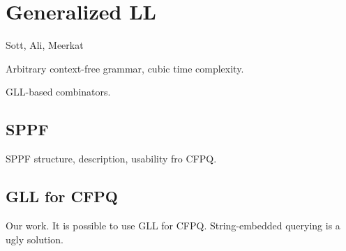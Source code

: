 \section{Generalized LL}

Sott, Ali, Meerkat

Arbitrary context-free grammar, cubic time complexity.

GLL-based combinators.


\subsection{SPPF}

SPPF structure, description, usability fro CFPQ.


\subsection{GLL for CFPQ}

Our work. 
It is possible to use GLL for CFPQ.
String-embedded querying is a ugly solution. 

